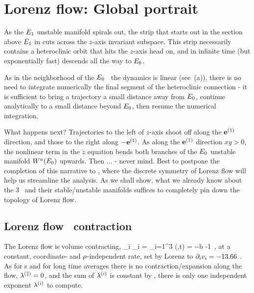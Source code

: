 \section{Lorenz flow: Global portrait}\label{exmp:LorenzGlob}

As the $\EQV{1}$ unstable manifold spirals out,
the strip that starts out in the section above $\EQV{1}$
in  cuts across the
$z$-axis invariant subspace. This strip necessarily contains a
heteroclinic orbit that hits the $z$-axis
head on, and in infinite time (but exponentially
fast) descends all the way to $\EQV{0}$.


 As in the neighborhood of the
$\EQV{0}$ \eqv\ the dynamics is linear
(see \,(a)), there
is no need to integrate numerically the final segment
of the heteroclinic
connection - it is sufficient to bring a trajectory
a small distance away from $\EQV{0}$, continue
analytically to a small distance
beyond $\EQV{0}$,
then resume the numerical integration.

What happens next? Trajectories to the left of $z$-axis shoot
off along the $\jEigvec[1]$ direction, and those to the
right along $-\jEigvec[1]$. As along the $\jEigvec[1]$ direction
$xy >0$, the nonlinear term in the $\dot{z}$ equation 
bends both branches of the
$\EQV{0}$ unstable manifold $W^u(\EQV{0})$ upwards.
Then $\ldots$ - never mind.
Best to postpone the completion of this narrative to
, where the discrete
symmetry of Lorenz flow will help us streamline the analysis.
As we shall show, what we already know about the 3 \eqva\ and
their stable/unstable manifolds suffices to completely pin down
the topology of Lorenz flow.


\subsection{Lorenz flow \statesp\ contraction}\label{exmp:LorenzContr}

The Lorenz flow is volume contracting,
\beq
\pde_i \pVeloc_i
 = \sum_{i=1}^{3} \eigExp[i](\ssp,t)
= -\sigma -b -1
    \,,
at a constant, coordinate- and $\rLor$-independent rate, set by
Lorenz to $\pde_i \pVeloc_i = -13.66$ . As for \po s and for
long time averages there is no contraction/expansion along the
flow, $\eigExp[\parallel]=0$, and the sum of $\eigExp[i]$ is
constant by , there is only one independent
exponent $\eigExp[i]$ to compute.


